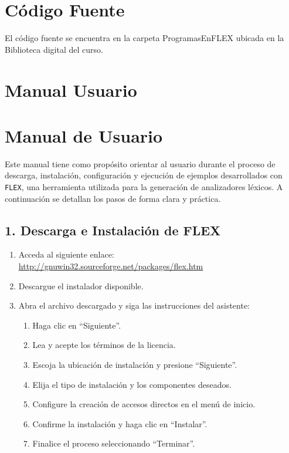 \documentclass{article}
\begin{document}

\section{Código Fuente}\label{sec:cod}

El código fuente se encuentra en la carpeta ProgramasEnFLEX ubicada en la Biblioteca digital del curso.


\section{Manual Usuario}\label{sec:man_u}

\section*{Manual de Usuario}

Este manual tiene como propósito orientar al usuario durante el proceso de descarga, instalación, configuración y ejecución de ejemplos desarrollados con \texttt{FLEX}, una herramienta utilizada para la generación de analizadores léxicos. A continuación se detallan los pasos de forma clara y práctica.

\subsection*{1. Descarga e Instalación de FLEX}

\begin{enumerate}
    \item Acceda al siguiente enlace: \url{http://gnuwin32.sourceforge.net/packages/flex.htm}
    \item Descargue el instalador disponible.
    \item Abra el archivo descargado y siga las instrucciones del asistente:
    \begin{enumerate}
        \item Haga clic en ``Siguiente''.
        \item Lea y acepte los términos de la licencia.
        \item Escoja la ubicación de instalación y presione ``Siguiente''.
        \item Elija el tipo de instalación y los componentes deseados.
        \item Configure la creación de accesos directos en el menú de inicio.
        \item Confirme la instalación y haga clic en ``Instalar''.
        \item Finalice el proceso seleccionando ``Terminar''.
    \end{enumerate}
\end{enumerate}
\end{document}
